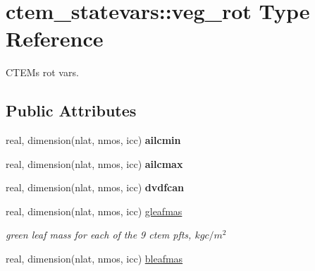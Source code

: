 \hypertarget{structctem__statevars_1_1veg__rot}{}\section{ctem\+\_\+statevars\+:\+:veg\+\_\+rot Type Reference}
\label{structctem__statevars_1_1veg__rot}


C\+T\+E\+M\textquotesingle{}s \textquotesingle{}rot\textquotesingle{} vars.  


\subsection*{Public Attributes}
\begin{DoxyCompactItemize}
\item 
\hypertarget{structctem__statevars_1_1veg__rot_a98b20cb953b33f7ab1f0281434c6e77c}{}real, dimension(nlat, nmos, icc) {\bfseries ailcmin}\label{structctem__statevars_1_1veg__rot_a98b20cb953b33f7ab1f0281434c6e77c}

\item 
\hypertarget{structctem__statevars_1_1veg__rot_a0f26b872fbe4ff683af5463ba17a6bf4}{}real, dimension(nlat, nmos, icc) {\bfseries ailcmax}\label{structctem__statevars_1_1veg__rot_a0f26b872fbe4ff683af5463ba17a6bf4}

\item 
\hypertarget{structctem__statevars_1_1veg__rot_a75a69342d39d42b1c02be36c335d8a76}{}real, dimension(nlat, nmos, icc) {\bfseries dvdfcan}\label{structctem__statevars_1_1veg__rot_a75a69342d39d42b1c02be36c335d8a76}

\item 
\hypertarget{structctem__statevars_1_1veg__rot_a5d6339b528811ebfb03169e5367a72d0}{}real, dimension(nlat, nmos, icc) \hyperlink{structctem__statevars_1_1veg__rot_a5d6339b528811ebfb03169e5367a72d0}{gleafmas}\label{structctem__statevars_1_1veg__rot_a5d6339b528811ebfb03169e5367a72d0}

\begin{DoxyCompactList}\small\item\em green leaf mass for each of the 9 ctem pfts, $kg c/m^2$ \end{DoxyCompactList}\item 
\hypertarget{structctem__statevars_1_1veg__rot_ac5f40b34d86771200e09907a80692d16}{}real, dimension(nlat, nmos, icc) \hyperlink{structctem__statevars_1_1veg__rot_ac5f40b34d86771200e09907a80692d16}{bleafmas}\label{structctem__statevars_1_1veg__rot_ac5f40b34d86771200e09907a80692d16}


\end{DoxyCompactItemize}
